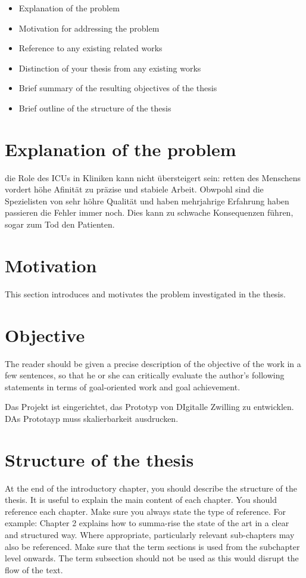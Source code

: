 \documentclass[12pt]{report}           %
\theoremstyle{thesis}        %
\begin{document}
	\begin{itemize}
		\itemsep -0.2cm
		\item Explanation of the problem  
		\item Motivation for addressing the problem
		\item Reference to any existing related works  
		\item Distinction of your thesis from any existing works 
		\item Brief summary of the resulting objectives of the thesis
		\item Brief outline of the structure of the thesis
	\end{itemize}
	\section{Explanation of the problem}
	die Role des ICUs in Kliniken kann nicht übersteigert sein: retten des Menschens vordert höhe Afinität zu präzise und stabiele Arbeit. Obwpohl sind die Spezielisten von sehr höhre Qualität und haben mehrjahrige Erfahrung haben passieren die Fehler immer noch. Dies kann zu schwache Konsequenzen führen, sogar zum Tod den Patienten. 
	\section{Motivation}
	This section introduces and motivates the problem investigated in the thesis. 
	
	\section{Objective}
	The reader should be given a precise description of the objective of the work in a few sentences, so that he or she can critically evaluate the author's following statements in terms of goal-oriented work and goal achievement.
	
	Das Projekt ist eingerichtet, das Prototyp von DIgitalle Zwilling zu entwicklen. DAs Prototayp muss skalierbarkeit ausdrucken.  
	
	\section{Structure of the thesis}
	At the end of the introductory chapter, you should describe the structure of the thesis. It is useful to explain the main content of each chapter. You should reference each chapter. Make sure you always state the type of reference. For example: Chapter 2 explains how to summa-rise the state of the art in a clear and structured way. Where appropriate, particularly relevant sub-chapters may also be referenced. Make sure that the term \glqq sections\grqq{} is used from the subchapter level onwards. The term \glqq subsection\grqq{} should not be used as this would disrupt the flow of the text.
	
\end{document}

